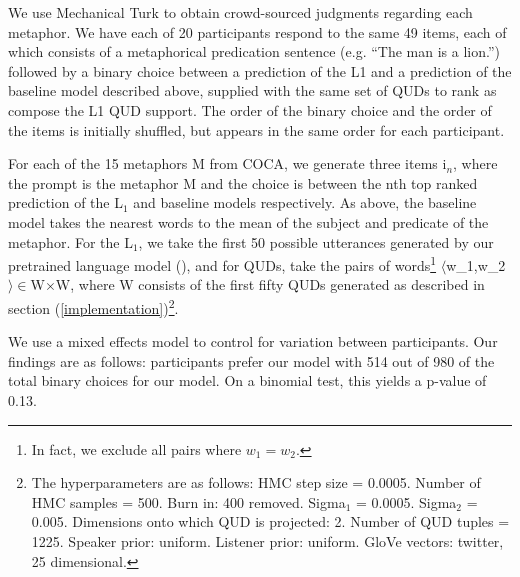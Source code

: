 \documentclass[10pt,letterpaper,twocolumn]{article}
\begin{document}
We use Mechanical Turk to obtain crowd-sourced judgments regarding each metaphor. We have each of 20 participants respond to the same 49 items, each of which consists of a metaphorical predication sentence (e.g. ``The man is a lion.'') followed by a binary choice between a prediction of the L1 and a prediction of the baseline model described above, supplied with the same set of QUDs to rank as compose the L1 QUD support. The order of the binary choice and the order of the items is initially shuffled, but appears in the same order for each participant.

For each of the 15 metaphors M from COCA, we generate three items i$_n$, where the prompt is the metaphor M and the choice is between the nth top ranked prediction of the L$_1$ and baseline models respectively. As above, the baseline model takes the nearest words to the mean of the subject and predicate of the metaphor. For the L$_1$, we take the first 50 possible utterances generated by our pretrained language model (\cite{jozefowicz2016exploring}), and for QUDs, take the pairs of words\footnote{In fact, we exclude all pairs where $w_1=w_2$.} $\langle$w_1,w_2$\rangle\in$W$\times$W, where W consists of the first fifty QUDs generated as described in section (\ref{implementation})\footnote{The hyperparameters are as follows: HMC step size = 0.0005. Number of HMC samples = 500. Burn in: 400 removed. Sigma$_1$ = 0.0005. Sigma$_2$ = 0.005. Dimensions onto which QUD is projected: 2. Number of QUD tuples = 1225. Speaker prior: uniform. Listener prior: uniform. GloVe vectors: twitter, 25 dimensional.}.

We use a mixed effects model to control for variation between participants. Our findings are as follows: participants prefer our model with 514 out of 980 of the total binary choices for our model. On a binomial test, this yields a p-value of 0.13. 
\end{document}

